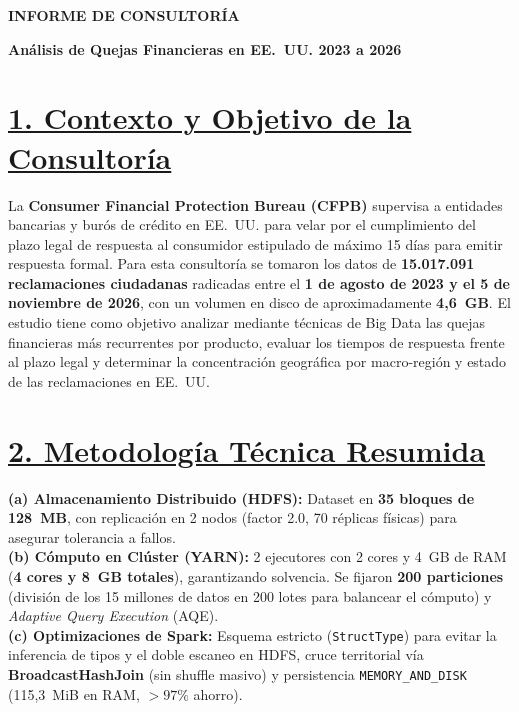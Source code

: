 \documentclass[12pt,letterpaper]{article}
\begin{document}
{\centering
    {\fontsize{12}{13.5}\selectfont \textbf{\color{primary}INFORME DE CONSULTORÍA}}\par
    \vspace{0.15em}
    {\fontsize{10.5}{12}\selectfont \textbf{\color{secondary}Análisis de Quejas Financieras en EE.~UU. 2023 a 2026}}\par
}
\vspace{0.15em}

\section*{\underline{1. Contexto y Objetivo de la Consultoría}}
La \textbf{Consumer Financial Protection Bureau (CFPB)} supervisa a entidades bancarias y burós de crédito en EE.~UU. para velar por el cumplimiento del plazo legal de respuesta al consumidor estipulado de máximo 15 días para emitir respuesta formal. Para esta consultoría se tomaron los datos de \textbf{15.017.091 reclamaciones ciudadanas} radicadas entre el \textbf{1 de agosto de 2023 y el 5 de noviembre de 2026}, con un volumen en disco de aproximadamente \textbf{4,6~GB}. El estudio tiene como objetivo analizar mediante técnicas de Big Data las quejas financieras más recurrentes por producto, evaluar los tiempos de respuesta frente al plazo legal y determinar la concentración geográfica por macro-región y estado de las reclamaciones en EE.~UU.

\section*{\underline{2. Metodología Técnica Resumida}}
\textbf{(a) Almacenamiento Distribuido (HDFS):} Dataset en \textbf{35 bloques de 128~MB}, con replicación en 2 nodos (factor 2.0, 70 réplicas físicas) para asegurar tolerancia a fallos. \\
\textbf{(b) Cómputo en Clúster (YARN):} 2 ejecutores con 2 cores y 4~GB de RAM (\textbf{4 cores y 8~GB totales}), garantizando solvencia. Se fijaron \textbf{200 particiones} (división de los 15 millones de datos en 200 lotes para balancear el cómputo) y \textit{Adaptive Query Execution} (AQE). \\
\textbf{(c) Optimizaciones de Spark:} Esquema estricto (\texttt{StructType}) para evitar la inferencia de tipos y el doble escaneo en HDFS, cruce territorial vía \textbf{BroadcastHashJoin} (sin shuffle masivo) y persistencia \texttt{MEMORY\_AND\_DISK} (115,3~MiB en RAM, $>97\%$ ahorro).
\end{document}
